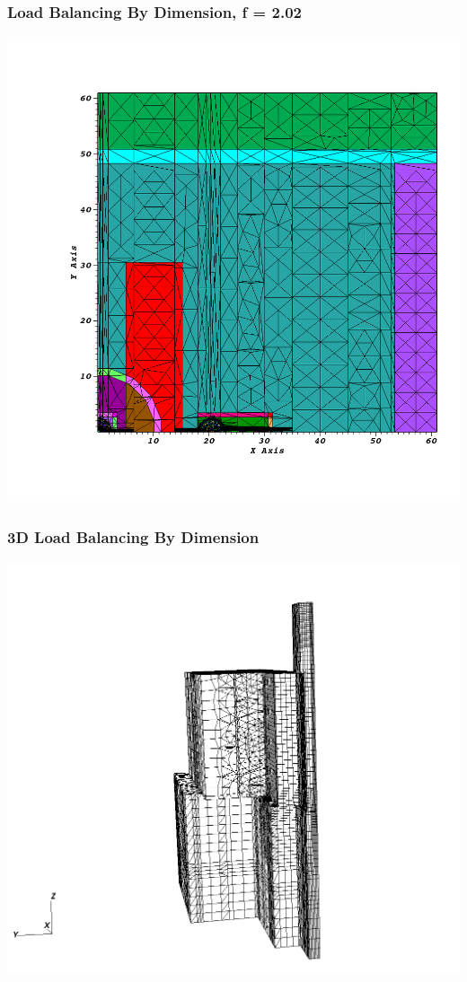 \documentclass[xcolor={usenames,dvipsnames,svgnames,table}]{beamer}
\begin{document}
\begin{frame}[t]\frametitle{Load Balancing By Dimension, f = 2.02}
\centering
\includegraphics[scale=0.22]{figures/im12d_newlb.png}
\end{frame}

\begin{frame}[t]\frametitle{3D Load Balancing By Dimension}
\centering
\includegraphics[trim={0cm 1cm 0cm 3cm},clip,scale=0.27]{figures/im1_foam_448.png}
\end{frame}
\end{document}
